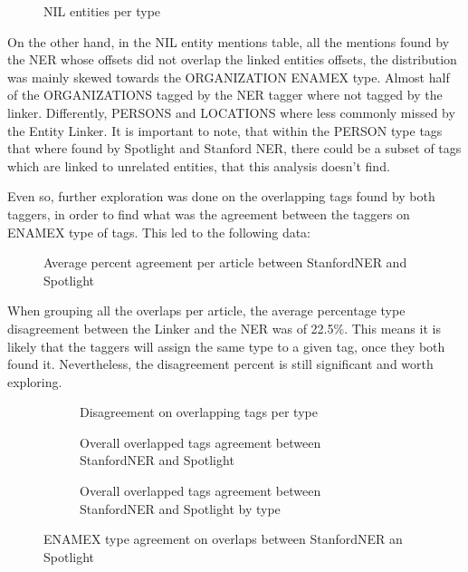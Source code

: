 \begin{figure}
  \label{fig:nilspertype}
  \centering
  \caption{NIL entities per type}
\end{figure}

On the other hand, in the NIL entity mentions table, all the mentions found by the NER whose offsets did not overlap the linked entities offsets,
the distribution was mainly skewed towards the ORGANIZATION ENAMEX type.
Almost half of the ORGANIZATIONS tagged by the NER tagger where not tagged by the linker.
Differently, PERSONS and LOCATIONS where less commonly missed by the Entity Linker.
It is important to note, that within the PERSON type tags that where found by Spotlight and Stanford NER, there could be a subset of tags which are linked to unrelated entities,
that this analysis doesn't find.

Even so, further exploration was done on the overlapping tags found by both taggers,
in order to find what was the agreement between the taggers on ENAMEX type of tags. 
This led to the following data:

\begin{figure}
  \label{fig:avgagreementpercentnernel}
  \centering
  \caption{Average percent agreement per article between StanfordNER and Spotlight}
\end{figure}

When grouping all the overlaps per article, the average percentage type disagreement between the Linker and the NER was of 22.5\%.
This means it is likely that the taggers will assign the same type to a given tag, once they both found it.
Nevertheless, the disagreement percent is still significant and worth exploring.

\begin{figure}
    \centering
    \begin{subfigure}
        \label{fig:disagreementpertype}
        \centering
        \caption{Disagreement on overlapping tags per type}
    \end{subfigure}%
    \begin{subfigure}
        \label{fig:agreementvsdisagreementpercent}
        \centering
        \caption{Overall overlapped tags agreement between StanfordNER and Spotlight}
    \end{subfigure}%
    \begin{subfigure}
        \label{fig:agreementnernelbytype}
        \centering
        \caption{Overall overlapped tags agreement between StanfordNER and Spotlight by type}
    \end{subfigure}%
    \caption{ENAMEX type agreement on overlaps between StanfordNER an Spotlight}
\end{figure}

